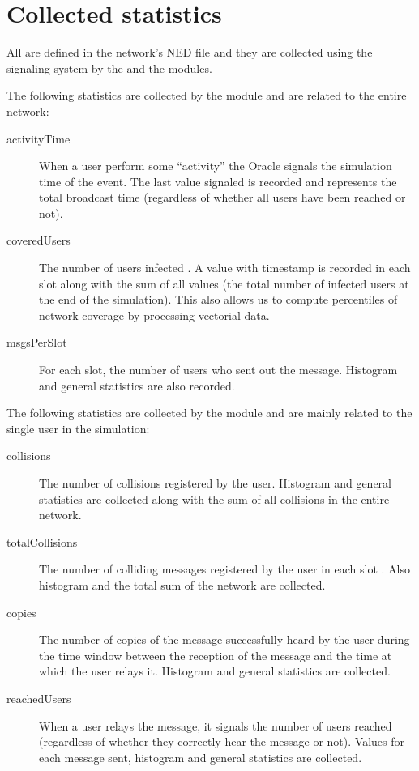 \section{Collected statistics}\label{sec:statistics}

All  are defined in the  network's NED file and
they are collected using the \omnetpp{} signaling system by the 
and the  modules.

The following statistics are collected by the  module and are
related to the entire  network:
\begin{description}
	\item[activityTime] When a user perform some ``activity''  the Oracle signals
		the simulation time of the event. The last value signaled is
		recorded and represents the total broadcast time (regardless of
		whether all users have been reached or not).
	\item[coveredUsers] The number of users infected . A value with timestamp is
		recorded in each slot along with the sum of all values (the
		total number of infected users at the end of the simulation).
		This also allows us to compute percentiles of network coverage
		by processing vectorial data.
	\item[msgsPerSlot] For each slot, the number of users who sent out
		the message. Histogram and general statistics  are also recorded.
\end{description}

The following statistics are collected by the  module and are mainly
related to the single user in the simulation:
\begin{description}
	\item[collisions] The number of collisions registered by the user.
		Histogram and general statistics are collected along with the
		sum of all collisions in the entire network.
	\item[totalCollisions] The number of colliding messages registered by
		the user in each slot . Also
		histogram and the total sum of the network are collected.
	\item[copies] The number of copies of the message successfully heard by
		the user during the time window between the reception of the
		message and the time at which the user relays it. Histogram and
		general statistics are collected.
	\item[reachedUsers] When a user relays the message, it signals the
		number of users reached (regardless of whether they correctly
		hear the message or not). Values for each message sent,
		histogram and general statistics are collected.
\end{description}
